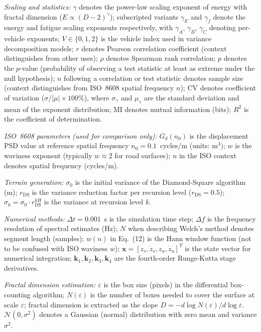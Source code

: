 \documentclass[11pt]{article}
\begin{document}
\textit{Scaling and statistics:} $\gamma$ denotes the power-law scaling exponent of energy with fractal dimension ($E \propto (D-2)^\gamma$); subscripted variants $\gamma_E$ and $\gamma_f$ denote the energy and fatigue scaling exponents respectively, with $\gamma_A$, $\gamma_B$, $\gamma_C$ denoting per-vehicle exponents; $V \in \{0,1,2\}$ is the vehicle index used in variance decomposition models; $r$ denotes Pearson correlation coefficient (context distinguishes from other uses); $\rho$ denotes Spearman rank correlation; $p$ denotes the $p$-value (probability of observing a test statistic at least as extreme under the null hypothesis); $n$ following a correlation or test statistic denotes sample size (context distinguishes from ISO~8608 spatial frequency $n$); CV denotes coefficient of variation ($\sigma/|\mu| \times 100\%$), where $\sigma_\gamma$ and $\mu_\gamma$ are the standard deviation and mean of the exponent distribution; MI denotes mutual information (bits); $R^2$ is the coefficient of determination.

\textit{ISO~8608 parameters (used for comparison only):} $G_d(n_0)$ is the displacement PSD value at reference spatial frequency $n_0 = 0.1$~cycles/m (units: m$^3$); $w$ is the waviness exponent (typically $w \approx 2$ for road surfaces); $n$ in the ISO context denotes spatial frequency (cycles/m).

\textit{Terrain generation:} $\sigma_0$ is the initial variance of the Diamond-Square algorithm (m); $r_{\text{DS}}$ is the variance reduction factor per recursion level ($r_{\text{DS}} = 0.5$); $\sigma_k = \sigma_0 \cdot r_{\text{DS}}^{kH}$ is the variance at recursion level $k$.

\textit{Numerical methods:} $\Delta t = 0.001$~s is the simulation time step; $\Delta f$ is the frequency resolution of spectral estimates (Hz); $N$ when describing Welch's method denotes segment length (samples); $w(n)$ in Eq.~(12) is the Hann window function (not to be confused with ISO waviness $w$); $\mathbf{x} = [z_s, \dot{z}_s, z_u, \dot{z}_u]^T$ is the state vector for numerical integration; $\mathbf{k}_1, \mathbf{k}_2, \mathbf{k}_3, \mathbf{k}_4$ are the fourth-order Runge-Kutta stage derivatives.

\textit{Fractal dimension estimation:} $\varepsilon$ is the box size (pixels) in the differential box-counting algorithm; $N(\varepsilon)$ is the number of boxes needed to cover the surface at scale $\varepsilon$; fractal dimension is extracted as the slope $D = -d\log N(\varepsilon)/d\log \varepsilon$. $\mathcal{N}(0,\sigma^2)$ denotes a Gaussian (normal) distribution with zero mean and variance $\sigma^2$.
\end{document}
